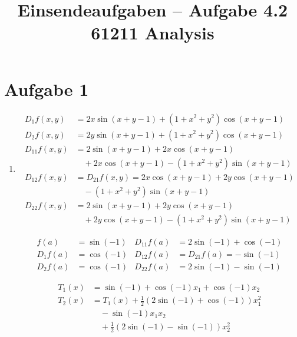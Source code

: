 \documentclass[a4paper,12pt]{article}
\title{Einsendeaufgaben -- Aufgabe 4.2\\[0.5em]
\large 61211 Analysis}
\author{}
\date{}
\begin{document}
\maketitle

\section*{Aufgabe 1}

\begin{enumerate}[label=\alph*)]

    \item
    \begin{align*}
        D_1 f(x,y) &= 2x \sin(x+y-1) + (1+x^2+y^2) \cos(x+y-1) \\
        D_2 f(x,y) &= 2y \sin(x+y-1) + (1+x^2+y^2) \cos(x+y-1) \\
        D_{11} f(x,y) &= 2 \sin(x+y-1) + 2x \cos(x+y-1) \\
                      &\quad + 2x \cos(x+y-1) - (1+x^2+y^2) \sin(x+y-1) \\
        D_{12} f(x,y) &= D_{21} f(x,y) = 2x \cos(x+y-1) + 2y \cos(x+y-1) \\
                      &\quad - (1+x^2+y^2) \sin(x+y-1) \\
        D_{22} f(x,y) &= 2 \sin(x+y-1) + 2y \cos(x+y-1) \\
                      &\quad + 2y \cos(x+y-1) - (1+x^2+y^2) \sin(x+y-1)
    \end{align*}

    \begin{align*}
        f(a) &= \sin(-1) & D_{11} f(a) &= 2 \sin(-1) + \cos(-1) \\
        D_1 f(a) &= \cos(-1) & D_{12} f(a) &= D_{21} f(a) = -\sin(-1) \\
        D_2 f(a) &= \cos(-1) & D_{22} f(a) &= 2 \sin(-1) - \sin(-1)
    \end{align*}

    \begin{align*}
        T_1(x) &= \sin(-1) + \cos(-1) x_1 + \cos(-1) x_2 \\
        T_2(x) &= T_1(x) + \tfrac{1}{2} (2 \sin(-1) + \cos(-1)) x_1^2 \\
               &\quad - \sin(-1) x_1 x_2 \\
               &\quad + \tfrac{1}{2} (2 \sin(-1) - \sin(-1)) x_2^2
    \end{align*}


\end{enumerate}
\end{document}
